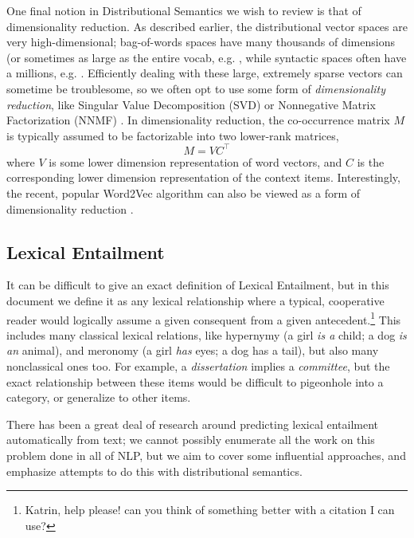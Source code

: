 \documentclass[letterpaper]{article}
\begin{document}
One final notion in Distributional Semantics we wish to review is that of
dimensionality reduction. As described earlier, the distributional vector
spaces are very high-dimensional; bag-of-words spaces have many thousands of
dimensions (or sometimes as large as the entire vocab, e.g.
, while syntactic spaces often have a millions,
e.g. . Efficiently dealing
with these large, extremely sparse vectors can sometime be troublesome, so
we often opt to use some form of {\em dimensionality reduction}, like
Singular Value Decomposition (SVD) \cite{landauer:1997:pr} or Nonnegative Matrix
Factorization (NNMF) \cite{lee:2000:nips}. In dimensionality
reduction, the co-occurrence matrix $M$ is typically assumed to be factorizable
into two lower-rank matrices,
\begin{equation*}
  M = VC^{\top}
\end{equation*}
where $V$ is some lower dimension representation of word vectors, and $C$
is the corresponding lower dimension representation of the context items.
Interestingly, the recent, popular Word2Vec algorithm \cite{mikolov:2013:iclr}
can also be viewed as a form of dimensionality reduction \cite{levy:2014:nips}.

\subsection{Lexical Entailment}

It can be difficult to give an exact definition of Lexical Entailment, but in
this document we define it as any lexical relationship where a typical,
cooperative reader would logically assume a given consequent from a given
antecedent.\footnote{Katrin, help please!  can you think of something better
with a citation I can use?} This includes many classical lexical relations,
like hypernymy (a girl {\em is a} child; a dog {\em is an} animal), and
meronomy (a girl {\em has} eyes; a dog {has a} tail), but also many
nonclassical ones too. For example, a {\em dissertation} implies a {\em
committee}, but the exact relationship between these items would be difficult
to pigeonhole into a category, or generalize to other items.

There has been a great deal of research around predicting lexical entailment
automatically from text; we cannot possibly enumerate all the work on this
problem done in all of NLP, but we aim to cover some influential approaches,
and emphasize attempts to do this with distributional semantics.
\end{document}
